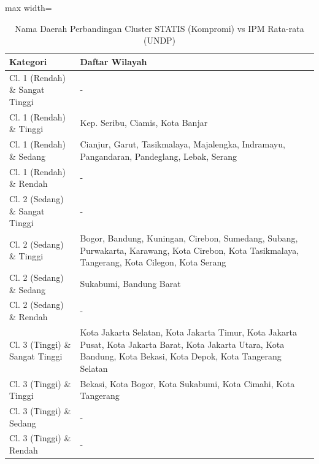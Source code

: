 \begin{table}[H]
\centering
\caption{Nama Daerah Perbandingan Cluster STATIS (Kompromi) vs IPM Rata-rata (UNDP)} \makeatletter{}\makeatother
\begin{adjustbox}{max width=\textwidth}
\begin{tabular}{|p{4cm}|p{10cm}|}
\hline
\textbf{Kategori} & \textbf{Daftar Wilayah} \\
\hline
Cl. 1 (Rendah) \& Sangat Tinggi & - \\
\hline
Cl. 1 (Rendah) \& Tinggi & Kep. Seribu, Ciamis, Kota Banjar \\
\hline
Cl. 1 (Rendah) \& Sedang & Cianjur, Garut, Tasikmalaya, Majalengka, Indramayu, Pangandaran, Pandeglang, Lebak, Serang \\
\hline
Cl. 1 (Rendah) \& Rendah & - \\
\hline
Cl. 2 (Sedang) \& Sangat Tinggi & - \\
\hline
Cl. 2 (Sedang) \& Tinggi & Bogor, Bandung, Kuningan, Cirebon, Sumedang, Subang, Purwakarta, Karawang, Kota Cirebon, Kota Tasikmalaya, Tangerang, Kota Cilegon, Kota Serang \\
\hline
Cl. 2 (Sedang) \& Sedang & Sukabumi, Bandung Barat \\
\hline
Cl. 2 (Sedang) \& Rendah & - \\
\hline
Cl. 3 (Tinggi) \& Sangat Tinggi & Kota Jakarta Selatan, Kota Jakarta Timur, Kota Jakarta Pusat, Kota Jakarta Barat, Kota Jakarta Utara, Kota Bandung, Kota Bekasi, Kota Depok, Kota Tangerang Selatan \\
\hline
Cl. 3 (Tinggi) \& Tinggi & Bekasi, Kota Bogor, Kota Sukabumi, Kota Cimahi, Kota Tangerang \\
\hline
Cl. 3 (Tinggi) \& Sedang & - \\
\hline
Cl. 3 (Tinggi) \& Rendah & - \\
\hline
\end{tabular}
\end{adjustbox}
\end{table}